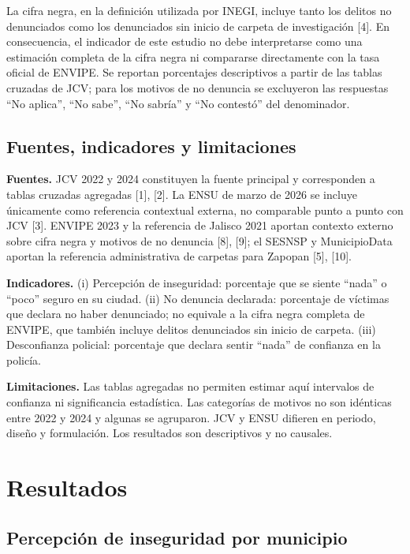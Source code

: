\documentclass[10pt,twocolumn,letterpaper]{article}
\begin{document}
La cifra negra, en la definición utilizada por INEGI, incluye tanto los
delitos no denunciados como los denunciados sin inicio de carpeta de
investigación [4]. En consecuencia, el indicador de este estudio no debe
interpretarse como una estimación completa de la cifra negra ni
compararse directamente con la tasa oficial de ENVIPE. Se reportan
porcentajes descriptivos a partir de las tablas cruzadas de JCV; para
los motivos de no denuncia se excluyeron las respuestas ``No aplica'',
``No sabe'', ``No sabría'' y ``No contestó'' del denominador.

\subsection{Fuentes, indicadores y limitaciones}

\textbf{Fuentes.} JCV 2022 y 2024 constituyen la fuente principal y
corresponden a tablas cruzadas agregadas [1], [2]. La ENSU de marzo de
2026 se incluye únicamente como referencia contextual externa, no
comparable punto a punto con JCV [3]. ENVIPE 2023 y la referencia de
Jalisco 2021 aportan contexto externo sobre cifra negra y motivos de no
denuncia [8], [9]; el SESNSP y MunicipioData aportan la referencia
administrativa de carpetas para Zapopan [5], [10].

\textbf{Indicadores.} (i) Percepción de inseguridad: porcentaje que se
siente ``nada'' o ``poco'' seguro en su ciudad. (ii) No denuncia
declarada: porcentaje de víctimas que declara no haber denunciado; no
equivale a la cifra negra completa de ENVIPE, que también incluye delitos
denunciados sin inicio de carpeta. (iii) Desconfianza policial:
porcentaje que declara sentir ``nada'' de confianza en la policía.

\textbf{Limitaciones.} Las tablas agregadas no permiten estimar aquí
intervalos de confianza ni significancia estadística. Las categorías de
motivos no son idénticas entre 2022 y 2024 y algunas se agruparon. JCV y
ENSU difieren en periodo, diseño y formulación. Los resultados son
descriptivos y no causales.

\section{Resultados}

\subsection{Percepción de inseguridad por municipio}
\end{document}
